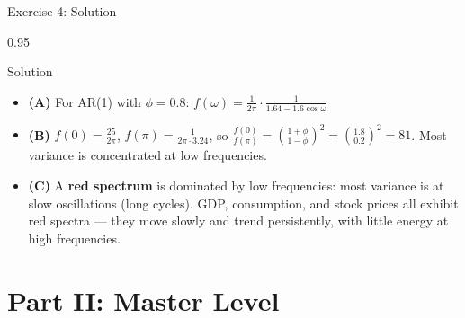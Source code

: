 \documentclass[9pt, aspectratio=169, t]{beamer}
\begin{document}
\begin{frame}{Exercise 4: Solution}
    \begin{cminipage}{0.95\textwidth}
    \begin{exampleblock}{Solution}
        {\small
        \begin{itemize}\setlength{\itemsep}{3pt}
            \item \textcolor{MainBlue}{\textbf{(A)}} For AR(1) with $\phi = 0.8$:
                $f(\omega) = \frac{1}{2\pi}\cdot\frac{1}{1.64 - 1.6\cos\omega}$
            \item \textcolor{MainBlue}{\textbf{(B)}} $f(0) = \frac{25}{2\pi}$, $f(\pi) = \frac{1}{2\pi \cdot 3.24}$, so
                $\frac{f(0)}{f(\pi)} = \left(\frac{1+\phi}{1-\phi}\right)^2 = \left(\frac{1.8}{0.2}\right)^2 = 81$.
                Most variance is concentrated at low frequencies.
            \item \textcolor{MainBlue}{\textbf{(C)}} A \textbf{red spectrum} is dominated by low frequencies: most variance is at slow oscillations (long cycles). GDP, consumption, and stock prices all exhibit red spectra --- they move slowly and trend persistently, with little energy at high frequencies.
        \end{itemize}
        }
    \end{exampleblock}
    \end{cminipage}
\end{frame}

\section{Part II: Master Level}
\end{document}
